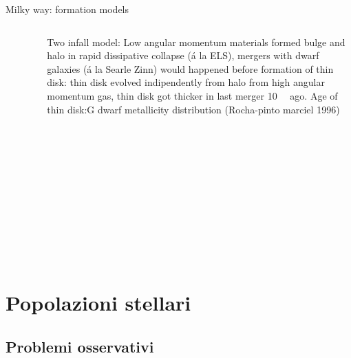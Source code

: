 \begin{frame}{Milky way: formation models}
\begin{columns}[T]
\begin{column}{0.4\textwidth}
\begin{figure}[!ht]\texttt{[image: MWformation]}\label{fig:MWformation}
\end{figure}
\end{column}
\begin{column}{0.6\textwidth}
Two infall model: Low angular momentum materials formed bulge and halo in rapid dissipative collapse (\'a la ELS), mergers with dwarf galaxies (\'a la Searle Zinn) would happened before formation of thin disk: thin disk evolved indipendently from halo from high angular momentum gas, thin disk got thicker in last merger \SI{10}{\giga\year} ago.
Age of thin disk:G dwarf metallicity distribution (Rocha-pinto marciel 1996)
\end{column}
\end{columns}
\end{frame}

\section{Popolazioni stellari}

\subsection{Problemi osservativi}

